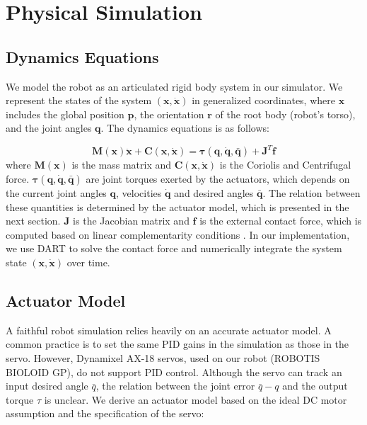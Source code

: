 \section{Physical Simulation}

\subsection{Dynamics Equations}

We model the robot as an articulated rigid body system in our simulator. We represent the states of the system $(\mathbf{x}, \dot{\mathbf{x}})$ in generalized coordinates, where $\mathbf{x}$ includes the global position $\mathbf{p}$, the orientation $\mathbf{r}$ of the root body (robot's torso), and the joint angles $\mathbf{q}$. The dynamics equations is as follows:

\begin{equation}
\label{eq:robotdynamics}
\mathbf{M}(\mathbf{x})\mathbf{\ddot{x}}+\mathbf{C}(\mathbf{x},\mathbf{\dot{x}})=\boldsymbol{\tau}(\mathbf{q}, \dot{\mathbf{q}}, \bar{\mathbf{q}})+\mathbf{J}^T\mathbf{f}
\end{equation}
where $\mathbf{M}(\mathbf{x})$ is the mass matrix and $\mathbf{C}(\mathbf{x},\mathbf{\dot{x}})$ is the Coriolis and Centrifugal force. $\boldsymbol{\tau}(\mathbf{q}, \dot{\mathbf{q}}, \bar{\mathbf{q}})$ are joint torques exerted by the actuators, which depends on the current joint angles $\mathbf{q}$, velocities $\dot{\mathbf{q}}$ and desired angles $\bar{\mathbf{q}}$. The relation between these quantities is determined by the actuator model, which is presented in the next section. $\mathbf{J}$ is the Jacobian matrix and $\mathbf{f}$ is the external contact force, which is computed based on linear complementarity conditions \cite{Tan:2012b}. In our implementation, we use DART to solve the contact force and numerically integrate the system state $(\mathbf{x}, \dot{\mathbf{x}})$ over time.

\subsection{Actuator Model}
\label{sec:motorDynamics}
A faithful robot simulation relies heavily on an accurate actuator model. A common practice is to set the same PID gains in the simulation as those in the servo. However, Dynamixel AX-18 servos, used on our robot (ROBOTIS BIOLOID GP), do not support PID control. Although the servo can track an input desired angle $\bar{q}$, the relation between the joint error $\bar{q}-q$ and the output torque $\tau$ is unclear. We derive an actuator model based on the ideal DC motor assumption and the specification of the servo:

